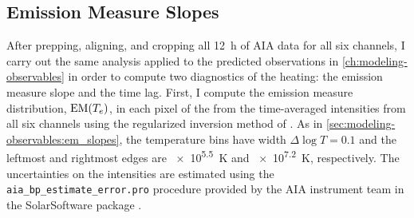 \subsection{Emission Measure Slopes}\label{sec:classifying-observables:em_slopes}

After prepping, aligning, and cropping all \SI{12}{\hour} of AIA data for all six channels, I carry out the same analysis applied to the predicted observations in \autoref{ch:modeling-observables} in order to compute two diagnostics of the heating: the emission measure slope and the time lag. First, I compute the emission measure distribution, $\textup{EM}(T_e)$, in each pixel of the \AR{} from the time-averaged intensities from all six channels using the regularized inversion method of \citet{hannah_differential_2012}. As in \autoref{sec:modeling-observables:em_slopes}, the temperature bins have width $\Delta\log T=0.1$ and the leftmost and rightmost edges are \SI{e5.5}{\kelvin} and \SI{e7.2}{\kelvin}, respectively. The uncertainties on the intensities are estimated using the \texttt{aia\_bp\_estimate\_error.pro} procedure provided by the AIA instrument team in the SolarSoftware package \citep[SSW,][]{freeland_data_1998}.

